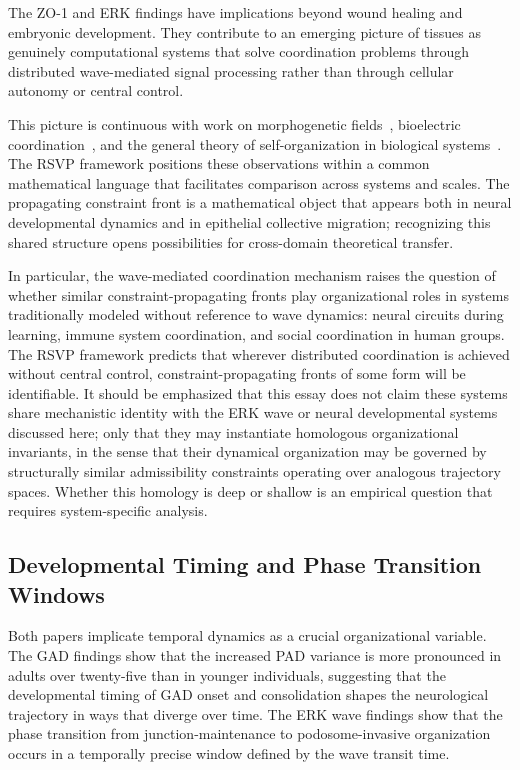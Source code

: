 \documentclass[11pt,a4paper]{article}
\theoremstyle{plain}
\theoremstyle{definition}
\begin{document}
The ZO-1 and ERK findings have implications beyond wound healing and embryonic development.
They contribute to an emerging picture of tissues as genuinely computational systems
that solve coordination problems through distributed wave-mediated signal processing
rather than through cellular autonomy or central control.

This picture is continuous with work on morphogenetic fields~\cite{Levin2012},
bioelectric coordination~\cite{Maturana1980}, and the general theory of self-organization
in biological systems~\cite{Camazine2003}. The RSVP framework positions these
observations within a common mathematical language that facilitates comparison across
systems and scales. The propagating constraint front is a mathematical object that
appears both in neural developmental dynamics and in epithelial collective migration;
recognizing this shared structure opens possibilities for cross-domain theoretical
transfer.

In particular, the wave-mediated coordination mechanism raises the question of whether
similar constraint-propagating fronts play organizational roles in systems traditionally
modeled without reference to wave dynamics: neural circuits during learning, immune
system coordination, and social coordination in human groups. The RSVP framework
predicts that wherever distributed coordination is achieved without central control,
constraint-propagating fronts of some form will be identifiable. It should be
emphasized that this essay does not claim these systems share mechanistic identity
with the ERK wave or neural developmental systems discussed here; only that they may
instantiate homologous organizational invariants, in the sense that their dynamical
organization may be governed by structurally similar admissibility constraints operating
over analogous trajectory spaces. Whether this homology is deep or shallow is an
empirical question that requires system-specific analysis.

\subsection{Developmental Timing and Phase Transition Windows}

Both papers implicate temporal dynamics as a crucial organizational variable. The GAD
findings show that the increased PAD variance is more pronounced in adults over
twenty-five than in younger individuals, suggesting that the developmental timing of
GAD onset and consolidation shapes the neurological trajectory in ways that diverge
over time. The ERK wave findings show that the phase transition from junction-maintenance
to podosome-invasive organization occurs in a temporally precise window defined by
the wave transit time.
\end{document}
